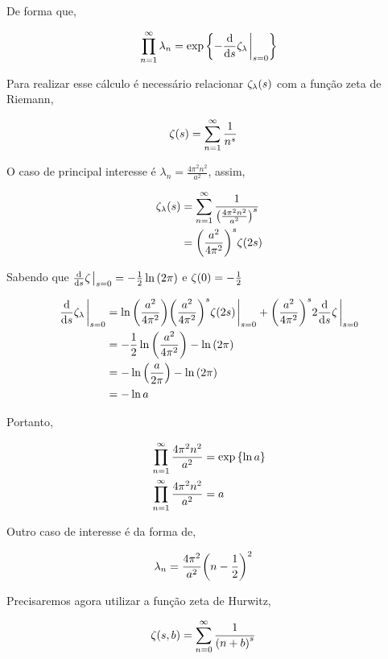 \documentclass[twoside]{amsart}
\numberwithin{equation}{section}
\begin{document}
De forma que,

\begin{align}
    \prod\limits_{n=1}^{\infty}\lambda_n=\exp\qty{-\dv{}{s}\zeta_\lambda\eval_{s=0}}
\end{align}

Para realizar esse cálculo é necessário relacionar $\zeta_\lambda\qty(s)$ com a função zeta de Riemann,

\begin{align}
    \zeta\qty(s)&=\sum\limits_{n=1}^\infty\frac{1}{n^s}
\end{align}

O caso de principal interesse é $\lambda_n=\frac{4\pi^2n^2}{a^2}$, assim,

\begin{align}
    \zeta_{\lambda}\qty(s)&=\sum\limits_{n=1}^{\infty}\frac{1}{\qty(\frac{4\pi^2n^2}{a^2})^s}\\
    &=\qty(\frac{a^2}{4\pi^2})^s\zeta\qty(2s)
\end{align}

Sabendo que $\dv{}{s}\zeta\eval_{s=0}=-\frac12\ln\qty(2\pi)$ e $\zeta\qty(0)=-\frac12$

\begin{align}
    \dv{}{s}\zeta_{\lambda}\eval_{s=0}&=\ln\qty(\frac{a^2}{4\pi^2})\qty(\frac{a^2}{4\pi^2})^s\zeta\qty(2s)\eval_{s=0}+\qty(\frac{a^2}{4\pi^2})^s2\dv{}{s}\zeta\eval_{s=0}\\
    &=-\frac12\ln\qty(\frac{a^2}{4\pi^2})-\ln\qty(2\pi)\\
    &=-\ln\qty(\frac{a}{2\pi})-\ln\qty(2\pi)\\
    &=-\ln a\\
\end{align}

Portanto,

\begin{align}
    \prod\limits_{n=1}^{\infty}\frac{4\pi^2n^2}{a^2}&=\exp\qty{\ln a}\\
    \prod\limits_{n=1}^{\infty}\frac{4\pi^2n^2}{a^2}&=a
\end{align}

Outro caso de interesse é da forma de,

\begin{align}
    \lambda_n&=\frac{4\pi^2}{a^2}\qty(n-\frac12)^2
\end{align}

Precisaremos agora utilizar a função zeta de Hurwitz,

\begin{align}
    \zeta\qty(s,b)&=\sum\limits_{n=0}^\infty\frac{1}{\qty(n+b)^s}
\end{align}
\end{document}
